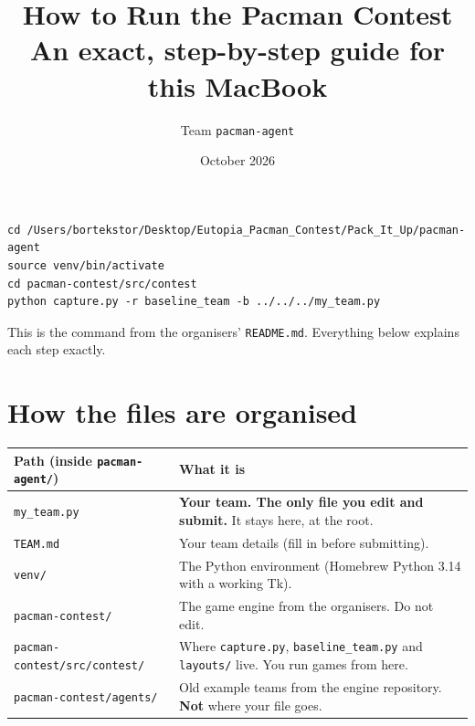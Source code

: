 \documentclass[11pt,a4paper]{article}
\title{\textbf{How to Run the Pacman Contest}\\[4pt]\large An exact, step-by-step guide for this MacBook}
\author{Team \texttt{pacman-agent}}
\date{October 2026}
\newcommand{\p}[1]{\nolinkurl{#1}}  %
\begin{document}
\maketitle

\begin{tcolorbox}[colback=accent!5, colframe=accent, title=\textbf{The 30-second version}, arc=2pt]
\begin{lstlisting}
cd /Users/bortekstor/Desktop/Eutopia_Pacman_Contest/Pack_It_Up/pacman-agent
source venv/bin/activate
cd pacman-contest/src/contest
python capture.py -r baseline_team -b ../../../my_team.py
\end{lstlisting}
This is the command from the organisers' \texttt{README.md}. Everything below explains each step exactly.
\end{tcolorbox}

\tableofcontents

\section{How the files are organised}

\begin{center}
\begin{tabularx}{\linewidth}{@{}lX@{}}
\toprule
\textbf{Path (inside \texttt{pacman-agent/})} & \textbf{What it is} \\
\midrule
\p{my_team.py} & \textbf{Your team. The only file you edit and submit.} It stays here, at the root. \\
\p{TEAM.md} & Your team details (fill in before submitting). \\
\p{venv/} & The Python environment (Homebrew Python 3.14 with a working Tk). \\
\p{pacman-contest/} & The game engine from the organisers. Do not edit. \\
\p{pacman-contest/src/contest/} & Where \texttt{capture.py}, \texttt{baseline\_team.py} and \texttt{layouts/} live. You run games from here. \\
\p{pacman-contest/agents/} & Old example teams from the engine repository. \textbf{Not} where your file goes. \\
\bottomrule
\end{tabularx}
\end{center}
\end{document}
